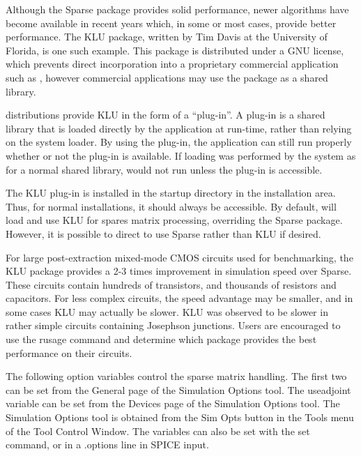 Although the Sparse package provides solid performance, newer
algorithms have become available in recent years which, in some or
most cases, provide better performance.  The KLU package, written by
Tim Davis at the University of Florida, is one such example.  This
package is distributed under a GNU license, which prevents direct
incorporation into a proprietary commercial application such as
{\WRspice}, however commercial applications may use the package as a
shared library.

{\WRspice} distributions provide KLU in the form of a ``plug-in''.  A
plug-in is a shared library that is loaded directly by the application
at run-time, rather than relying on the system loader.  By using the
plug-in, the application can still run properly whether or not the
plug-in is available.  If loading was performed by the system as for a
normal shared library, {\WRspice} would not run unless the plug-in is
accessible.

The KLU plug-in is installed in the {\vt startup} directory in the
{\WRspice} installation area.  Thus, for normal installations, it
should always be accessible.  By default, {\WRspice} will load and use
KLU for spares matrix processing, overriding the Sparse package. 
However, it is possible to direct {\WRspice} to use Sparse rather than
KLU if desired. 

For large post-extraction mixed-mode CMOS circuits used for
benchmarking, the KLU package provides a 2-3 times improvement in
simulation speed over Sparse.  These circuits contain hundreds of
transistors, and thousands of resistors and capacitors.  For less
complex circuits, the speed advantage may be smaller, and in some
cases KLU may actually be slower.  KLU was observed to be slower in
rather simple circuits containing Josephson junctions.  Users are
encouraged to use the {\cb rusage} command and determine which package
provides the best performance on their circuits.

The following option variables control the sparse matrix handling. 
The first two can be set from the {\cb General} page of the {\cb
Simulation Options} tool.  The {\vt useadjoint} variable can be set
from the {\cb Devices} page of the {\cb Simulation Options} tool.  The
{\cb Simulation Options} tool is obtained from the {\cb Sim Opts}
button in the {\cb Tools} menu of the {\WRspice} {\cb Tool Control
Window}.  The variables can also be set with the {\cb set} command, or
in a {\vt .options} line in SPICE input.

